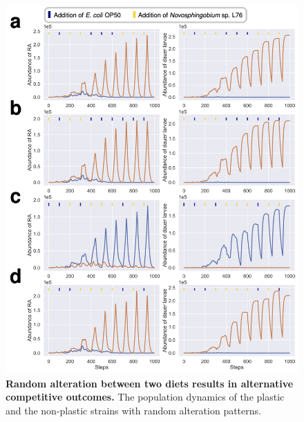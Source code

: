 \documentclass[10pt,letterpaper]{article}
\begin{document}
\begin{figure}
\begin{adjustwidth}{-2in}{0in}
    \begin{flushright}
\includegraphics[width=120mm]{figures/figureS3.jpg}
\caption{\textbf{Random alteration between two diets results in alternative competitive outcomes.} The population dynamics of the plastic and the non-plastic strains with random alteration patterns.}
\label{fig:figs3}
\end{flushright}
\end{adjustwidth}
\end{figure}
\end{document}
